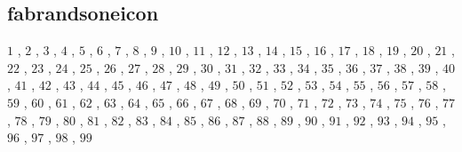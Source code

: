 \subsection{fabrandsoneicon}

$1$ , $2$ , $3$ , $4$ , $5$ , $6$ , $7$ , $8$ , $9$ , $10$ , $11$ , $12$ , $13$ , $14$ , $15$ , $16$ , $17$ , $18$ , $19$ , $20$ , $21$ , $22$ , $23$ , $24$ , $25$ , $26$ , $27$ , $28$ , $29$ , $30$ , $31$ , $32$ , $33$ , $34$ , $35$ , $36$ , $37$ , $38$ , $39$ , $40$ , $41$ , $42$ , $43$ , $44$ , $45$ , $46$ , $47$ , $48$ , $49$ , $50$ , $51$ , $52$ , $53$ , $54$ , $55$ , $56$ , $57$ , $58$ , $59$ , $60$ , $61$ , $62$ , $63$ , $64$ , $65$ , $66$ , $67$ , $68$ , $69$ , $70$ , $71$ , $72$ , $73$ , $74$ , $75$ , $76$ , $77$ , $78$ , $79$ , $80$ , $81$ , $82$ , $83$ , $84$ , $85$ , $86$ , $87$ , $88$ , $89$ , $90$ , $91$ , $92$ , $93$ , $94$ , $95$ , $96$ , $97$ , $98$ , $99$ 


